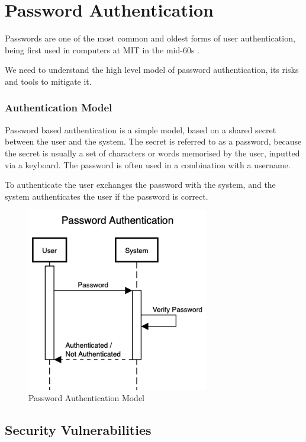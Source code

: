 \section{Password Authentication}
\label{section:password-authentication}

Passwords are one of the most common and oldest forms of user authentication, being first used in computers at MIT in the mid-60s \cite{mcmillan2012password}.

We need to understand the high level model of password authentication, its risks and tools to mitigate it.

\subsubsection{Authentication Model}

Password based authentication is a simple model, based on a shared secret between the user and the system. The secret is referred to as a password, because the secret is usually a set of characters or words memorised by the user, inputted via a keyboard.
The password is often used in a combination with a username.

To authenticate the user exchanges the password with the system, and the system authenticates the user if the password is correct.

\begin{figure}[h]
	\centering
	\includegraphics[height=8cm]{images/password-authentication}
	\caption{Password Authentication Model}
	\label{fig:password-authentication}
\end{figure}

\subsection{Security Vulnerabilities}
\label{label:password-vulnerabilities}

